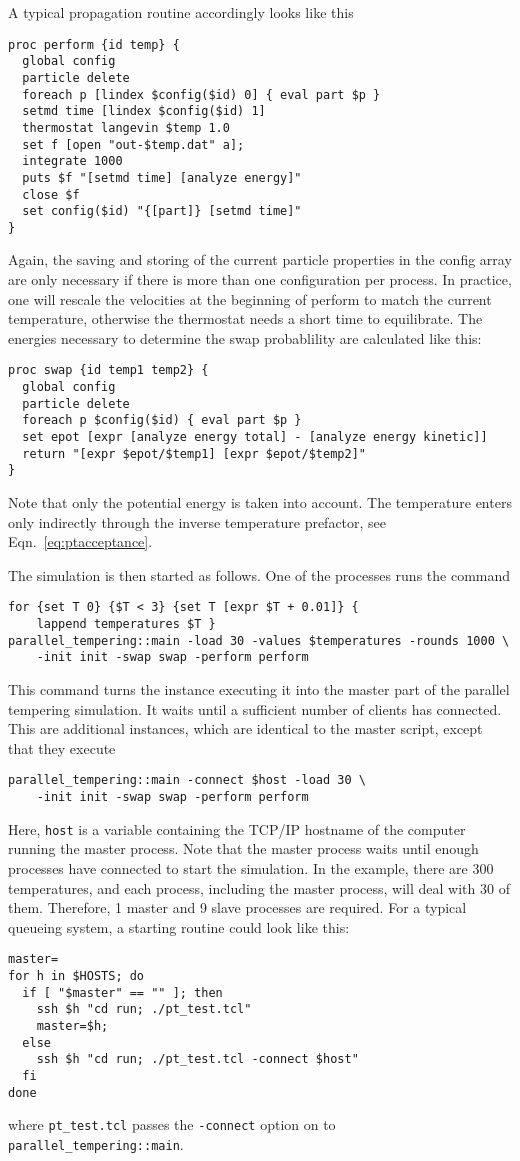 A typical propagation routine accordingly looks like this
\begin{verbatim}
proc perform {id temp} {
  global config
  particle delete
  foreach p [lindex $config($id) 0] { eval part $p }
  setmd time [lindex $config($id) 1]
  thermostat langevin $temp 1.0
  set f [open "out-$temp.dat" a];
  integrate 1000
  puts $f "[setmd time] [analyze energy]"
  close $f
  set config($id) "{[part]} [setmd time]"
}
\end{verbatim}
Again, the saving and storing of the current particle properties in the config array are only
necessary if there is more than one configuration per process. In practice, one will rescale the
velocities at the beginning of perform to match the current temperature, otherwise the thermostat
needs a short time to equilibrate. The energies necessary to determine the swap probablility are
calculated like this:
\begin{verbatim}
proc swap {id temp1 temp2} {
  global config
  particle delete
  foreach p $config($id) { eval part $p }
  set epot [expr [analyze energy total] - [analyze energy kinetic]]
  return "[expr $epot/$temp1] [expr $epot/$temp2]"
}
\end{verbatim}
Note that only the potential energy is taken into account. The temperature enters only indirectly
through the inverse temperature prefactor, see Eqn.~\eqref{eq:ptacceptance}.

The simulation is then started as follows. One of the processes runs the command
\begin{verbatim}
for {set T 0} {$T < 3} {set T [expr $T + 0.01]} {
    lappend temperatures $T }
parallel_tempering::main -load 30 -values $temperatures -rounds 1000 \
    -init init -swap swap -perform perform
\end{verbatim}
This command turns the \es instance executing it into the master part of the parallel tempering
simulation. It waits until a sufficient number of clients has connected. This are additional \es{}
instances, which are identical to the master script, except that they execute
\begin{verbatim}
parallel_tempering::main -connect $host -load 30 \
    -init init -swap swap -perform perform
\end{verbatim}
Here, {\tt host} is a variable containing the TCP/IP hostname of the computer running the master
process. Note that the master process waits until enough processes have connected to start the
simulation. In the example, there are 300 temperatures, and each process, including the master
process, will deal with 30 of them. Therefore, 1 master and 9 slave processes are required. For a
typical queueing system, a starting routine could look like this:
\begin{verbatim}
master=
for h in $HOSTS; do
  if [ "$master" == "" ]; then
    ssh $h "cd run; ./pt_test.tcl"
    master=$h;
  else
    ssh $h "cd run; ./pt_test.tcl -connect $host"
  fi
done
\end{verbatim}
where {\tt pt_test.tcl} passes the {\tt -connect} option on to {\tt parallel_tempering::main}.

